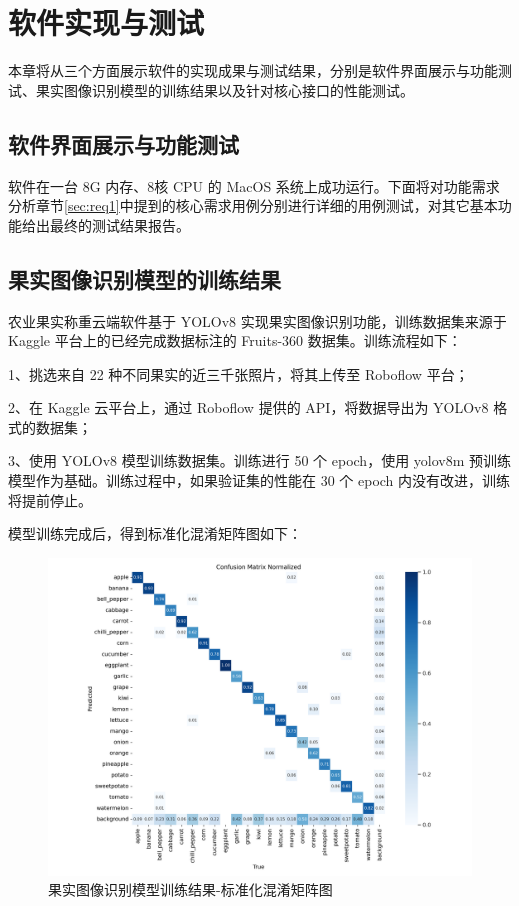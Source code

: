 \chapter{软件实现与测试}

本章将从三个方面展示软件的实现成果与测试结果，分别是软件界面展示与功能测试、果实图像识别模型的训练结果以及针对核心接口的性能测试。

\section{软件界面展示与功能测试}\label{sec:test-func}

软件在一台 8G 内存、8核 CPU 的 MacOS 系统上成功运行。下面将对功能需求分析章节\ref{sec:req1}中提到的核心需求用例分别进行详细的用例测试，对其它基本功能给出最终的测试结果报告。


\section{果实图像识别模型的训练结果}\label{sec:test-model}

农业果实称重云端软件基于 YOLOv8 实现果实图像识别功能，训练数据集来源于 Kaggle 平台上的已经完成数据标注的 Fruits-360 数据集。训练流程如下：

1、挑选来自 22 种不同果实的近三千张照片，将其上传至 Roboflow 平台；

2、在 Kaggle 云平台上，通过 Roboflow 提供的 API，将数据导出为 YOLOv8 格式的数据集；

3、使用 YOLOv8 模型训练数据集。训练进行 50 个 epoch，使用 yolov8m 预训练模型作为基础。训练过程中，如果验证集的性能在 30 个 epoch 内没有改进，训练将提前停止。

模型训练完成后，得到标准化混淆矩阵图如下：

\begin{figure}[H]
    \centering
    \includegraphics[width=0.8\linewidth]{../source/aws-img/yolov8/out/image/confusion_matrix_normalized.png}
    \caption{果实图像识别模型训练结果-标准化混淆矩阵图}
    \label{fig:confusion_matrix_normalized}
\end{figure}

